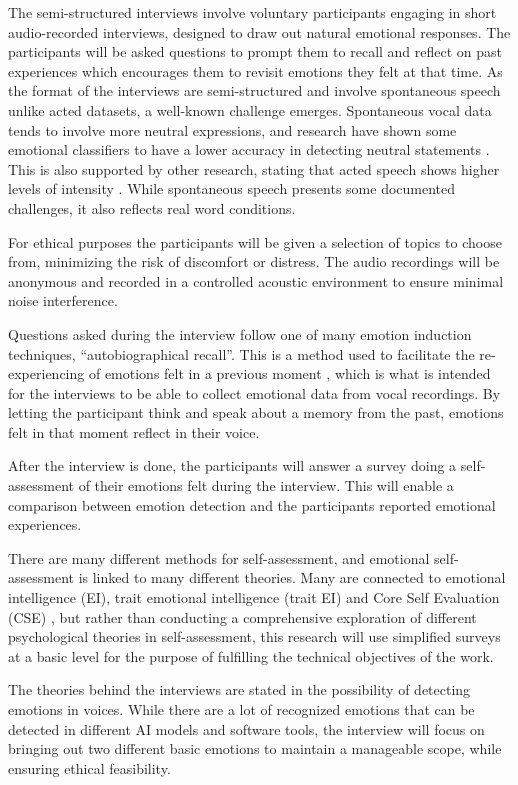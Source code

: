 The semi-structured interviews involve voluntary participants engaging in short audio-recorded interviews, designed to draw out natural emotional responses. The participants will be asked questions to prompt them to recall and reflect on past experiences which encourages them to revisit emotions they felt at that time. 
As the format of the interviews are semi-structured and involve spontaneous speech unlike acted datasets, a well-known challenge emerges. Spontaneous vocal data tends to involve more neutral expressions, and research have shown some emotional classifiers to have a lower accuracy in detecting neutral statements \autocite{Cao2015}. This is also supported by other research, stating that acted speech shows higher levels of intensity \autocite{Chakraborty2016}. While spontaneous speech presents some documented challenges, it also reflects real word conditions.

For ethical purposes the participants will be given a selection of topics to choose from, minimizing the risk of discomfort or distress. The audio recordings will be anonymous and recorded in a controlled acoustic environment to ensure minimal noise interference.

Questions asked during the interview follow one of many emotion induction techniques, “autobiographical recall”. This is a method used to facilitate the re-experiencing of emotions felt in a previous moment \autocite{Siedlecka2019}, which is what is intended for the interviews to be able to collect emotional data from vocal recordings. By letting the participant think and speak about a memory from the past, emotions felt in that moment reflect in their voice.

After the interview is done, the participants will answer a survey doing a self-assessment of their emotions felt during the interview. This will enable a comparison between emotion detection and the participants reported emotional experiences.

There are many different methods for self-assessment, and emotional self-assessment is linked to many different theories. Many are connected to emotional intelligence (EI), trait emotional intelligence (trait EI) and Core Self Evaluation (CSE) \autocite{Montasem2013}, but rather than conducting a comprehensive exploration of different psychological theories in self-assessment, this research will use simplified surveys at a basic level for the purpose of fulfilling the technical objectives of the work. 

The theories behind the interviews are stated in the possibility of detecting emotions in voices. While there are a lot of recognized emotions that can be detected in different AI models and software tools, the interview will focus on bringing out two different basic emotions to maintain a manageable scope, while ensuring ethical feasibility.

